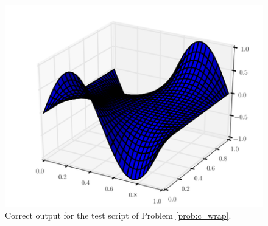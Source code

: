 \begin{problem}
\begin{figure}[H]
\includegraphics[width=\textwidth]{solution.png}
\caption{Correct output for the test script of Problem \ref{prob:c_wrap}.}
\label{fig:solution}
\end{figure}

\end{problem}

